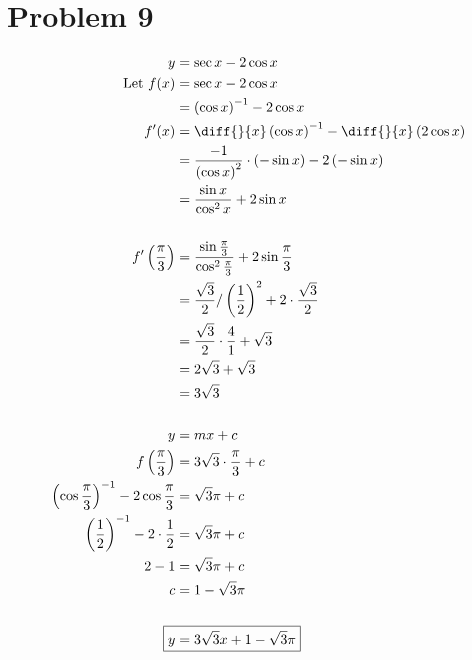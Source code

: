 \documentclass{article}
\begin{document}
\section*{Problem 9}
    \begin{align*}
        y&=\sec x-2\cos x \\
        \text{Let }f(x)&=\sec x-2\cos x \\
        &=\left(\cos x\right)^{-1}-2\cos x \\
        f'(x)&=\diff{}{x}\left(\cos x\right)^{-1}-\diff{}{x}\left(2\cos x\right) \\
        &=\frac{-1}{\left(\cos x\right)^2}\cdot\left(-\sin x\right)-2\left(-\sin x\right) \\
        &=\frac{\sin x}{\cos^2x}+2\sin x \\
        \\
        f'\left(\frac{\pi}{3}\right)&=\frac{\sin\frac{\pi}{3}}{\cos^2\frac{\pi}{3}}+2\sin\frac{\pi}{3} \\
        &=\frac{\sqrt{3}}{2}/\left(\frac{1}{2}\right)^2+2\cdot\frac{\sqrt{3}}{2} \\
        &=\frac{\sqrt{3}}{2}\cdot\frac{4}{1}+\sqrt{3} \\
        &=2\sqrt{3}+\sqrt{3} \\
        &=3\sqrt{3} \\
        \\
        y&=mx+c \\
        f\left(\frac{\pi}{3}\right)&=3\sqrt{3}\cdot\frac{\pi}{3}+c \\
        \left(\cos\frac{\pi}{3}\right)^{-1}-2\cos\frac{\pi}{3}&=\sqrt{3}\pi+c \\
        \left(\frac{1}{2}\right)^{-1}-2\cdot\frac{1}{2}&=\sqrt{3}\pi+c \\
        2-1&=\sqrt{3}\pi+c \\
        c&=1-\sqrt{3}\pi \\
        \\
        \Aboxed{y&=3\sqrt{3}x+1-\sqrt{3}\pi} \\
    \end{align*}
\end{document}
